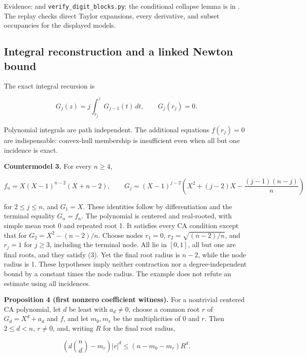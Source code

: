 \documentclass[
  british,
  10pt,
]{article}
\begin{document}
Evidence: 
and \texttt{verify\_digit\_blocks.py}; the conditional collapse lemma is
in . The replay checks
direct Taylor expansions, every derivative, and subset occupancies for
the displayed models.

\subsection{Integral reconstruction and a linked Newton
bound}\label{integral-reconstruction-and-a-linked-newton-bound}

The exact integral recursion is

\[
       G_j(z)=j\int_{r_j}^{z}G_{j-1}(t)\,dt,
       \qquad G_j(r_j)=0.                                \tag{3}
\]

Polynomial integrals are path independent. The additional equations
\(f(r_j)=0\) are indispensable: convex-hull membership is insufficient
even when all but one incidence is exact.

\textbf{Countermodel 3.} For every \(n\ge4\),

\[
 f_n=X(X-1)^{n-2}(X+n-2),\qquad
 G_j=(X-1)^{j-2}\left(X^2+(j-2)X-\frac{(j-1)(n-j)}n\right)
                                                               \tag{4}
\]

for \(2\le j\le n\), and \(G_1=X\). These identities follow by
differentiation and the terminal equality \(G_n=f_n\). The polynomial is
centered and real-rooted, with simple mean root 0 and repeated root 1.
It satisfies every CA condition except that for \(G_2=X^2-(n-2)/n\).
Choose nodes \(r_1=0\), \(r_2=\sqrt{(n-2)/n}\), and \(r_j=1\) for
\(j\ge3\), including the terminal node. All lie in \([0,1]\), all but
one are final roots, and they satisfy (3). Yet the final root radius is
\(n-2\), while the node radius is 1. These hypotheses imply neither
contraction nor a degree-independent bound by a constant times the node
radius. The example does not refute an estimate using all incidences.

\textbf{Proposition 4 (first nonzero coefficient witness).} For a
nontrivial centered CA polynomial, let \(d\) be least with \(a_d\ne0\),
choose a common root \(r\) of \(G_d=X^d+a_d\) and \(f\), and let
\(m_0,m_r\) be the multiplicities of 0 and \(r\). Then \(2\le d<n\),
\(r\ne0\), and, writing \(R\) for the final root radius,

\[
 \left(d\binom nd-m_r\right)|r|^d
       \le(n-m_0-m_r)R^d.                                \tag{5}
\]
\end{document}
